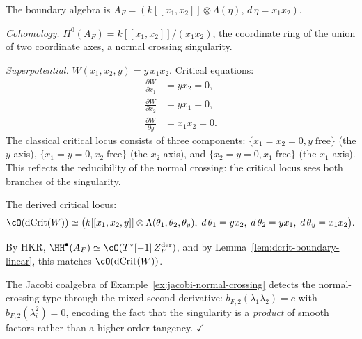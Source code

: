 \begin{computation}[Normal crossing: $F(x_1, x_2) = x_1 x_2$]
\label{comp:lg-normal-crossing}
The boundary algebra is
$A_F = (k[[x_1, x_2]] \otimes \Lambda(\eta),\,
d\,\eta = x_1 x_2)$.

\emph{Cohomology.}
$H^0(A_F) = k[[x_1, x_2]]/(x_1 x_2)$, the coordinate ring of
the union of two coordinate axes, a normal crossing singularity.

\emph{Superpotential.} $W(x_1, x_2, y) = y\, x_1 x_2$.
Critical equations:
\begin{align*}
\frac{\partial W}{\partial x_1} &= y x_2 = 0, \\
\frac{\partial W}{\partial x_2} &= y x_1 = 0, \\
\frac{\partial W}{\partial y} &= x_1 x_2 = 0.
\end{align*}
The classical critical locus consists of three components:
$\{x_1 = x_2 = 0, y\;\text{free}\}$ (the $y$-axis),
$\{x_1 = y = 0, x_2\;\text{free}\}$ (the $x_2$-axis), and
$\{x_2 = y = 0, x_1\;\text{free}\}$ (the $x_1$-axis).
This reflects the reducibility of the normal crossing: the critical
locus sees both branches of the singularity.

The derived critical locus:
\[
\cO(\operatorname{dCrit}(W))
\simeq
\bigl(k[[x_1, x_2, y]] \otimes
\Lambda(\theta_1, \theta_2, \theta_y),\;
d\,\theta_1 = yx_2,\;
d\,\theta_2 = yx_1,\;
d\,\theta_y = x_1 x_2\bigr).
\]

By HKR, $\HH^\bullet(A_F) \simeq \cO(T^*[-1]\, Z_F^{\mathrm{der}})$,
and by Lemma~\ref{lem:dcrit-boundary-linear}, this matches
$\cO(\operatorname{dCrit}(W))$.

The Jacobi coalgebra of Example~\ref{ex:jacobi-normal-crossing}
detects the normal-crossing type through the mixed second
derivative: $b_{F,2}(\lambda_1 \lambda_2) = c$ with
$b_{F,2}(\lambda_i^2) = 0$, encoding the fact that the
singularity is a \emph{product} of smooth factors rather
than a higher-order tangency.
\hfill$\checkmark$
\end{computation}

